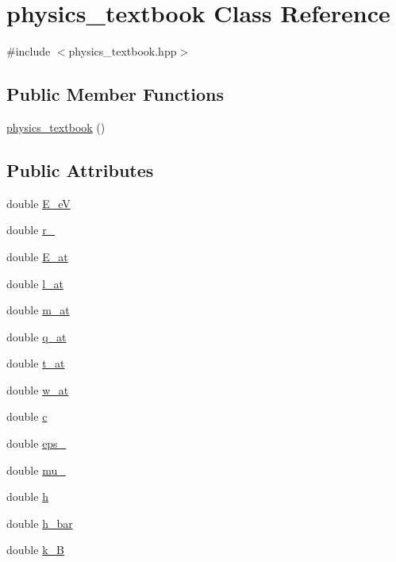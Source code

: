 \hypertarget{classphysics__textbook}{}\section{physics\+\_\+textbook Class Reference}
\label{classphysics__textbook}


{\ttfamily \#include $<$physics\+\_\+textbook.\+hpp$>$}

\subsection*{Public Member Functions}
\begin{DoxyCompactItemize}
\item 
\hyperlink{classphysics__textbook_a89b6993c2aecf444cd2fa540c73a110b}{physics\+\_\+textbook} ()
\end{DoxyCompactItemize}
\subsection*{Public Attributes}
\begin{DoxyCompactItemize}
\item 
double \hyperlink{classphysics__textbook_a73e078553f4f440e99aacad83f7df6d6}{E\+\_\+eV}
\item 
double \hyperlink{classphysics__textbook_ac429976f0dc885d846d8b31c24f45bd6}{r\+\_}
\item 
double \hyperlink{classphysics__textbook_aed1451ff3400dce39969e5ac319f033a}{E\+\_\+at}
\item 
double \hyperlink{classphysics__textbook_a4479790cea56c47a7db44d2d331c4cef}{l\+\_\+at}
\item 
double \hyperlink{classphysics__textbook_a6bb18bb140fbce54e2c73a7f2a72509f}{m\+\_\+at}
\item 
double \hyperlink{classphysics__textbook_aba33444d21762e4cbcfec165e6fd3ece}{q\+\_\+at}
\item 
double \hyperlink{classphysics__textbook_acdcf772ff70c544f8394b3a9fc57674c}{t\+\_\+at}
\item 
double \hyperlink{classphysics__textbook_a63250c79f053fa4aa1c8f3505971b4f1}{w\+\_\+at}
\item 
double \hyperlink{classphysics__textbook_a3c6dd19f14166d6c90d6f53aa4e31885}{c}
\item 
double \hyperlink{classphysics__textbook_a8ea9a65f207ec6ad3388e605f385454c}{eps\+\_}
\item 
double \hyperlink{classphysics__textbook_a300762c199172d9f76183b49db5f0f33}{mu\+\_}
\item 
double \hyperlink{classphysics__textbook_a416573e2d9fa6793711a69cdb291d824}{h}
\item 
double \hyperlink{classphysics__textbook_a5ec9850f0fa1b25180d8f6d1ed734848}{h\+\_\+bar}
\item 
double \hyperlink{classphysics__textbook_a666f84f0f7f65910169ed6b82129e5c8}{k\+\_\+B}
\end{DoxyCompactItemize}


